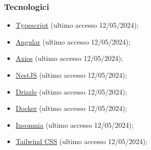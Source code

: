 \subsubsection{Tecnologici}
\begin{itemize}
	\item \href{https://www.typescriptlang.org/}
	      {Typescript} (ultimo accesso 12/05/2024);

	\item \href{https://angular.io/}
	      {Angular} (ultimo accesso 12/05/2024);

	\item \href{https://axios-http.com/}
	      {Axios} (ultimo accesso 12/05/2024);

	\item \href{https://nestjs.com/}
	      {NestJS} (ultimo accesso 12/05/2024);

	\item \href{https://orm.drizzle.team/}
	      {Drizzle} (ultimo accesso 12/05/2024);

	\item \href{https://www.docker.com/}
	      {Docker} (ultimo accesso 12/05/2024);

	\item \href{https://insomnia.rest/}
	      {Insomnia} (ultimo accesso 12/05/2024);

	\item \href{https://tailwindcss.com/}
	      {Tailwind CSS} (ultimo accesso 12/05/2024);
\end{itemize}